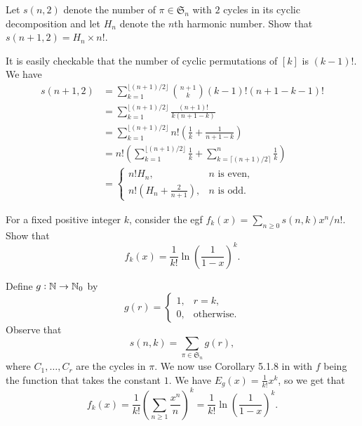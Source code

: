 	\begin{problem}
		Let $s(n,2)$ denote the number of $\pi \in \mathfrak{S}_n$ with $2$ cycles in its cyclic decomposition and let $H_n$ denote the $n$th harmonic number. Show that $s(n+1,2) = H_n \times n!$.
	\end{problem}
	\begin{solution*}
		It is easily checkable that the number of cyclic permutations of $[k]$ is $(k-1)!$. We have
		\begin{align*}
			s(n+1,2) &= \sum_{k=1}^{\lfloor (n+1)/2 \rfloor} \binom{n+1}{k} (k-1)! (n+1-k-1)! \\
				&= \sum_{k=1}^{\lfloor (n+1)/2 \rfloor} \frac{(n+1)!}{k(n+1-k)} \\
				&= \sum_{k=1}^{\lfloor (n+1)/2 \rfloor} n! \left( \frac{1}{k} + \frac{1}{n+1-k} \right) \\
				&= n! \left(\sum_{k=1}^{\lfloor (n+1)/2 \rfloor} \frac{1}{k} + \sum_{k=\lceil (n+1)/2 \rceil}^{n} \frac{1}{k} \right) \\
				&= \begin{cases} n!H_n, & \text{$n$ is even}, \\ n! (H_n + \frac{2}{n+1}), & \text{$n$ is odd.} \end{cases} 
		\end{align*}
	\end{solution*}

	\begin{problem}
		For a fixed positive integer $k$, consider the egf $f_k(x) = \sum_{n \ge 0} s(n,k) x^n/n!$. Show that
		\[ f_k(x) = \frac{1}{k!} \ln\left( \frac{1}{1-x} \right)^k. \]
	\end{problem}
	\begin{solution*}
		Define $g : \mathbb{N} \to \mathbb{N}_0$ by
		\[ g(r) = \begin{cases} 1, & r = k, \\ 0, & \text{otherwise.} \end{cases} \]
		Observe that
		\[ s(n,k) = \sum_{\pi \in \mathfrak{S}_n} g(r), \]
		where $C_1,\ldots,C_r$ are the cycles in $\pi$. We now use Corollary 5.1.8 in \cite{ec2} with $f$ being the function that takes the constant $1$. We have $E_g(x) = \frac{1}{k!} x^k$, so we get that
		\[ f_k(x) = \frac{1}{k!} \left( \sum_{n \ge 1} \frac{x^n}{n} \right)^k = \frac{1}{k!} \ln \left( \frac{1}{1-x} \right)^k. \]
	\end{solution*}

